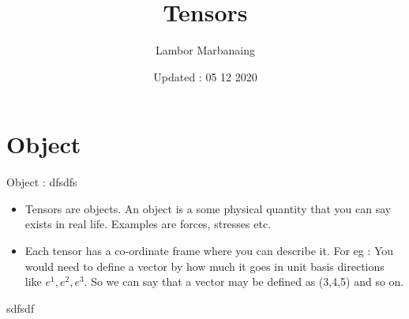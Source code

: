 
\title{Tensors }
\author{Lambor Marbanaing}
\date{Updated : 05 12 2020}
\maketitle
\tableofcontents

\section{Object}
\begin{frame}{Object : dfsdfs}
	\begin{itemize}
		
		\item Tensors are objects. An object is a some physical quantity that you can say exists in real life. Examples are forces, stresses etc.
		
		\item Each tensor has a co-ordinate frame where you can describe it. For eg : You would need to define a vector by how much it goes in unit basis directions like $e^1, e^2, e^3$. So we can say that a vector may be defined as (3,4,5) and so on. 
	\end{itemize}
\end{frame}

\begin{frame}
	sdfsdf
\end{frame}



